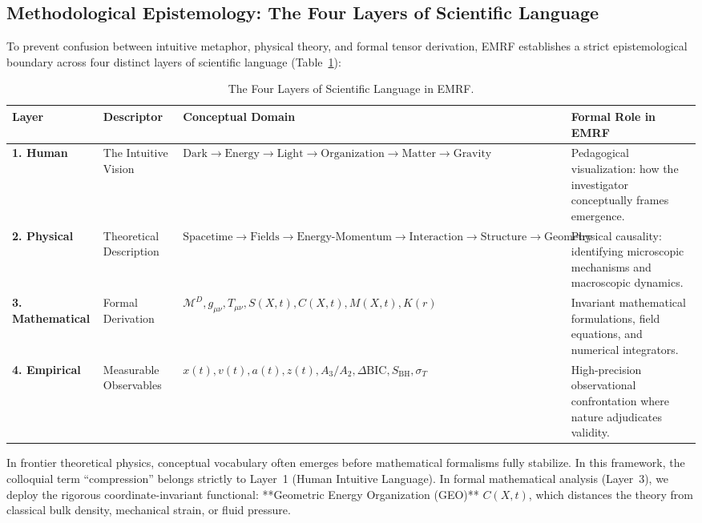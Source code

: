 \documentclass[11pt,a4paper]{article}
\begin{document}
\subsection{Methodological Epistemology: The Four Layers of Scientific Language}

To prevent confusion between intuitive metaphor, physical theory, and formal tensor derivation, EMRF establishes a strict epistemological boundary across four distinct layers of scientific language (Table~\ref{tab:four_layers}):

\begin{table}[htbp]
\centering
\small
\caption{The Four Layers of Scientific Language in EMRF.}
\label{tab:four_layers}
\begin{tabularx}{\textwidth}{lp{3.5cm}p{4.5cm}X}
\toprule
\textbf{Layer} & \textbf{Descriptor} & \textbf{Conceptual Domain} & \textbf{Formal Role in EMRF} \\
\midrule
\textbf{1. Human} & The Intuitive Vision & $\text{Dark} \to \text{Energy} \to \text{Light} \to \text{Organization} \to \text{Matter} \to \text{Gravity}$ & Pedagogical visualization: how the investigator conceptually frames emergence. \\
\textbf{2. Physical} & Theoretical Description & $\text{Spacetime} \to \text{Fields} \to \text{Energy-Momentum} \to \text{Interaction} \to \text{Structure} \to \text{Geometry}$ & Physical causality: identifying microscopic mechanisms and macroscopic dynamics. \\
\textbf{3. Mathematical} & Formal Derivation & $\mathcal{M}^D, g_{\mu\nu}, T_{\mu\nu}, S(X,t), C(X,t), M(X,t), K(r)$ & Invariant mathematical formulations, field equations, and numerical integrators. \\
\textbf{4. Empirical} & Measurable Observables & $x(t), v(t), a(t), z(t), A_3/A_2, \Delta\text{BIC}, S_{\text{BH}}, \sigma_T$ & High-precision observational confrontation where nature adjudicates validity. \\
\bottomrule
\end{tabularx}
\end{table}

In frontier theoretical physics, conceptual vocabulary often emerges before mathematical formalisms fully stabilize. In this framework, the colloquial term ``compression'' belongs strictly to Layer~1 (Human Intuitive Language). In formal mathematical analysis (Layer~3), we deploy the rigorous coordinate-invariant functional: **Geometric Energy Organization (GEO)** $C(X,t)$, which distances the theory from classical bulk density, mechanical strain, or fluid pressure.
\end{document}
